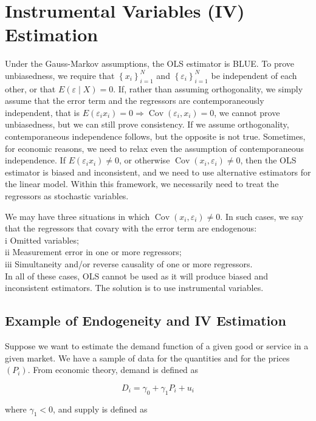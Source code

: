 \section{Instrumental Variables (IV) Estimation}
Under the Gauss-Markov assumptions, the OLS estimator is BLUE. To prove unbiasedness, we require that $\left\{x_{i}\right\}_{i=1}^{N}$ and $\left\{\varepsilon_{i}\right\}_{i=1}^{N}$ be independent of each other, or that $E(\varepsilon \mid X)=0$. If, rather than assuming orthogonality, we simply assume that the error term and the regressors are contemporaneously independent, that is $E\left(\varepsilon_{i} x_{i}\right)=0 \Longrightarrow \operatorname{Cov}\left(\varepsilon_{i}, x_{i}\right)=0$, we cannot prove unbiasedness, but we can still prove consistency. If we assume orthogonality, contemporaneous independence follows, but the opposite is not true. Sometimes, for economic reasons, we need to relax even the assumption of contemporaneous independence. If $E\left(\varepsilon_{i} x_{i}\right) \neq 0$, or otherwise $\operatorname{Cov}\left(x_{i}, \varepsilon_{i}\right) \neq 0$, then the OLS estimator is biased and inconsistent, and we need to use alternative estimators for the linear model. Within this framework, we necessarily need to treat the regressors as stochastic variables.

We may have three situations in which $\operatorname{Cov}\left(x_{i}, \varepsilon_{i}\right) \neq 0$. In such cases, we say that the regressors that covary with the error term are endogenous:\\
i Omitted variables;\\
ii Measurement error in one or more regressors;\\
iii Simultaneity and/or reverse causality of one or more regressors.\\
In all of these cases, OLS cannot be used as it will produce biased and inconsistent estimators. The solution is to use instrumental variables.

\subsection{Example of Endogeneity and IV Estimation}
Suppose we want to estimate the demand function of a given good or service in a given market. We have a sample of data for the quantities and for the prices $\left(P_{i}\right)$. From economic theory, demand is defined as

$$
D_{i}=\gamma_{0}+\gamma_{1} P_{i}+u_{i}
$$

where $\gamma_{1}<0$, and supply is defined as

